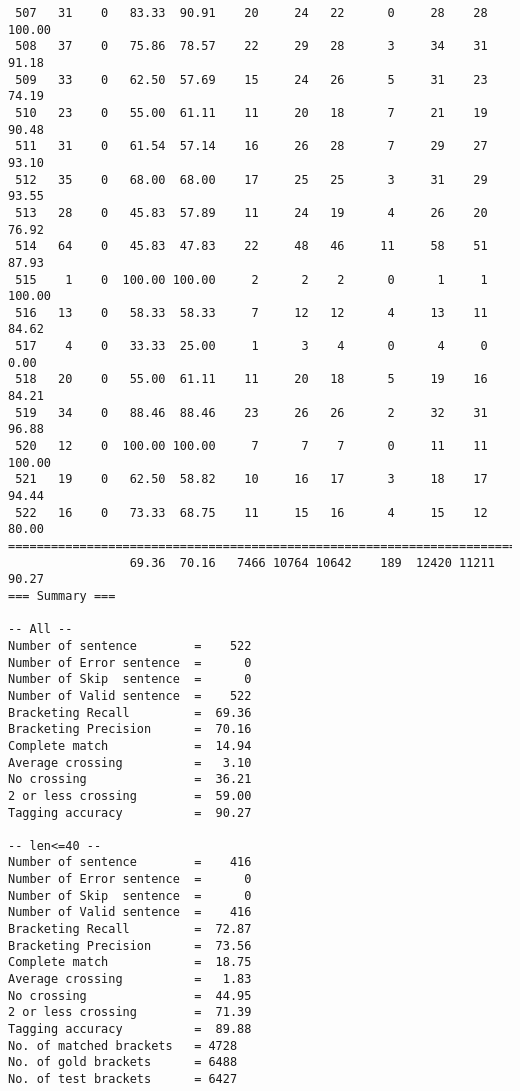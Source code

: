 \begin{verbatim}
 507   31    0   83.33  90.91    20     24   22      0     28    28   100.00
 508   37    0   75.86  78.57    22     29   28      3     34    31    91.18
 509   33    0   62.50  57.69    15     24   26      5     31    23    74.19
 510   23    0   55.00  61.11    11     20   18      7     21    19    90.48
 511   31    0   61.54  57.14    16     26   28      7     29    27    93.10
 512   35    0   68.00  68.00    17     25   25      3     31    29    93.55
 513   28    0   45.83  57.89    11     24   19      4     26    20    76.92
 514   64    0   45.83  47.83    22     48   46     11     58    51    87.93
 515    1    0  100.00 100.00     2      2    2      0      1     1   100.00
 516   13    0   58.33  58.33     7     12   12      4     13    11    84.62
 517    4    0   33.33  25.00     1      3    4      0      4     0     0.00
 518   20    0   55.00  61.11    11     20   18      5     19    16    84.21
 519   34    0   88.46  88.46    23     26   26      2     32    31    96.88
 520   12    0  100.00 100.00     7      7    7      0     11    11   100.00
 521   19    0   62.50  58.82    10     16   17      3     18    17    94.44
 522   16    0   73.33  68.75    11     15   16      4     15    12    80.00
============================================================================
                 69.36  70.16   7466 10764 10642    189  12420 11211    90.27
=== Summary ===

-- All --
Number of sentence        =    522
Number of Error sentence  =      0
Number of Skip  sentence  =      0
Number of Valid sentence  =    522
Bracketing Recall         =  69.36
Bracketing Precision      =  70.16
Complete match            =  14.94
Average crossing          =   3.10
No crossing               =  36.21
2 or less crossing        =  59.00
Tagging accuracy          =  90.27

-- len<=40 --
Number of sentence        =    416
Number of Error sentence  =      0
Number of Skip  sentence  =      0
Number of Valid sentence  =    416
Bracketing Recall         =  72.87
Bracketing Precision      =  73.56
Complete match            =  18.75
Average crossing          =   1.83
No crossing               =  44.95
2 or less crossing        =  71.39
Tagging accuracy          =  89.88
No. of matched brackets   = 4728
No. of gold brackets      = 6488
No. of test brackets      = 6427

\end{verbatim}

\normalsize

